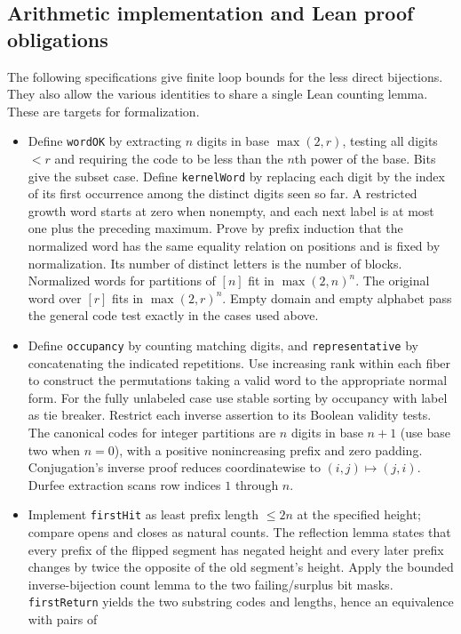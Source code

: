 \subsection{Arithmetic implementation and Lean proof obligations}
The following specifications give finite loop bounds for the less direct
bijections. They also allow the various identities to share a single Lean
counting lemma. These are targets for formalization.
\begin{itemize}
\item Define \texttt{wordOK} by extracting $n$ digits in base
$\max(2,r)$, testing all digits $<r$ and requiring the code to be less
than the $n$th power of the base. Bits give the subset case.
Define \texttt{kernelWord} by replacing each digit by the index of its
first occurrence among the distinct digits seen so far. A restricted
growth word starts at zero when nonempty, and each next label is at most
one plus the preceding maximum. Prove by prefix induction that the
normalized word has the same equality relation on positions and is fixed
by normalization. Its number of distinct letters is the number of blocks.
Normalized words for partitions of $[n]$ fit in $\max(2,n)^n$. The original word over $[r]$ fits in $\max(2,r)^n$. Empty domain and empty alphabet pass the general code test
exactly in the cases used above.
\item Define \texttt{occupancy} by counting matching digits, and
\texttt{representative} by concatenating the indicated repetitions.
Use increasing rank within each fiber to construct the permutations
taking a valid word to the appropriate normal form. For the fully
unlabeled case use stable sorting by occupancy with label as tie breaker.
Restrict each inverse assertion to its Boolean validity tests. The
canonical codes for integer partitions are $n$ digits in base $n+1$
(use base two when $n=0$), with a positive nonincreasing prefix and
zero padding. Conjugation's inverse proof reduces coordinatewise to
$(i,j)\mapsto(j,i)$. Durfee extraction scans row indices $1$ through $n$.
\item Implement \texttt{firstHit} as least prefix length $\le2n$ at the
specified height; compare opens and closes as natural counts. The
reflection lemma states that every prefix of the flipped segment has
negated height and every later prefix changes by twice the opposite of
the old segment's height. Apply the bounded inverse-bijection count
lemma to the two failing/surplus bit masks. \texttt{firstReturn} yields
the two substring codes and lengths, hence an equivalence with pairs of

\end{itemize}
